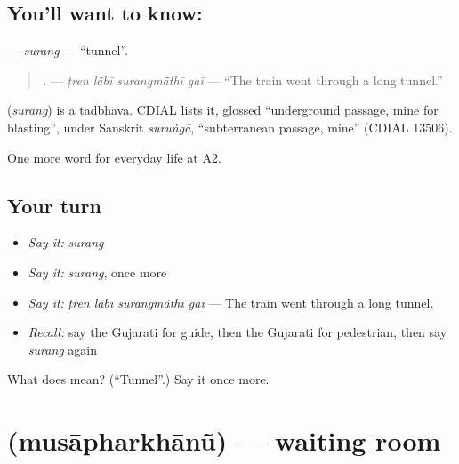 \subsection*{You'll want to know: }
\textbf{} — \emph{surang} — \textquotedblleft{}tunnel\textquotedblright{}.

\begin{quote}
\textbf{   .} — \emph{ṭren lā̃bī surangmā̃thī gaī} — \textquotedblleft{}The train went through a long tunnel.\textquotedblright{}
\end{quote}

\begin{cousinweb}
\textbf{} (\emph{surang}) is a tadbhava. CDIAL lists it, glossed \textquotedblleft{}underground passage, mine for blasting\textquotedblright{}, under Sanskrit \emph{suruṅgā}, \textquotedblleft{}subterranean passage, mine\textquotedblright{} (CDIAL 13506).
\end{cousinweb}

\begin{grammarlens}[title={What you've built}]
One more word for everyday life at A2.
\end{grammarlens}

\subsection*{Your turn}
\begin{itemize}
\raggedright
  \item \emph{Say it:} \emph{surang}
  \item \emph{Say it:} \emph{surang}, once more
  \item \emph{Say it:} \emph{ṭren lā̃bī surangmā̃thī gaī} — The train went through a long tunnel.
  \item \emph{Recall:} say the Gujarati for guide, then the Gujarati for pedestrian, then say \emph{surang} again
\end{itemize}

\begin{tcolorbox}[breakable,colback=teal!4,colframe=teal!35!black,title={Before you move on}]
What does  mean? (\textquotedblleft{}Tunnel\textquotedblright{}.) Say it once more.
\end{tcolorbox}
\section[\texorpdfstring{\gu{મુસાફરખાનું} (musāpharkhānũ)}{મુસાફરખાનું (musāpharkhānũ)}]{ (musāpharkhānũ) — waiting room}

